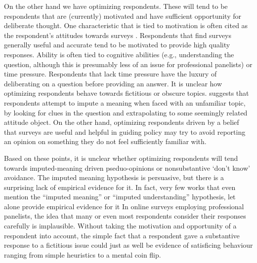 \documentclass[Royal,times,sageh]{sagej}
\begin{document}
On the other hand we have optimizing respondents. These will tend to be
respondents that are (currently) motivated and have sufficient
opportunity for deliberate thought. One characteristic that is tied to
motivation is often cited as the respondent's attitudes towards surveys
\citep{Stocke2004a, Stocke2004c}. Respondents that find surveys
generally useful and accurate tend to be motivated to provide high
quality responses. Ability is often tied to cognitive abilities (e.g.,
understanding the question, although this is presumably less of an issue
for professional panelists) or time pressure. Respondents that lack time
pressure have the luxury of deliberating on a question before providing
an answer. It is unclear how optimizing respondents behave towards
fictitious or obscure topics. \citet{Sturgis2010} suggests that
respondents attempt to impute a meaning when faced with an unfamiliar
topic, by looking for clues in the question and extrapolating to some
seemingly related attitude object. On the other hand, optimizing
respondents driven by a belief that surveys are useful and helpful in
guiding policy may try to avoid reporting an opinion on something they
do not feel sufficiently familiar with.

Based on these points, it is unclear whether optimizing respondents will
tend towards imputed-meaning driven pseduo-opinions or nonsubstantive
`don't know' avoidance. The imputed meaning hypothesis is persuasive,
but there is a surprising lack of empirical evidence for it. In fact,
very few works that even mention the ``imputed meaning'' or ``imputed
understanding'' hypothesis, let alone provide empirical evidence for it
\citetext{\citealp[p.~1219]{Schuman1980}; \citealp[p.~208]{Bishop1980}; \citealp{Morin1995}; \citealp{Bishop2001}; \citealp[p.~79
reference their own empirical findings, while \citet{Smith1981}, p.~14,
26]{Sturgis2010}; \citealp[p.~26--33]{Bishop2005}; \citealp[p.~62]{Kreuter2002}; \citealp[p.~61]{Noack2015}; \citealp[p.~344
discuss the hypothesis but do not investigate it
empirically.]{Wolter2019}} In online surveys employing professional
panelists, the idea that many or even most respondents consider their
responses carefully is implausible. Without taking the motivation and
opportunity of a respondent into account, the simple fact that a
respondent gave a substantive response to a fictitious issue could just
as well be evidence of satisficing behaviour ranging from simple
heuristics to a mental coin flip.
\end{document}
